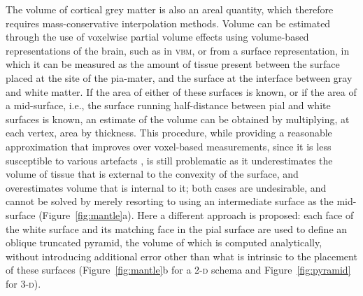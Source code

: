 The volume of cortical grey matter is also an areal quantity, which therefore requires mass-conservative interpolation methods. Volume can be estimated through the use of voxelwise partial volume effects using volume-based representations of the brain, such as in \textsc{vbm}, or from a surface representation, in which it can be measured as the amount of tissue present between the surface placed at the site of the pia-mater, and the surface at the interface between gray and white matter. If the area of either of these surfaces is known, or if the area of a mid-surface, i.e., the surface running half-distance between pial and white surfaces \citep{vanEssen2005} is known, an estimate of the volume can be obtained by multiplying, at each vertex, area by thickness. This procedure, while providing a reasonable approximation that improves over voxel-based measurements, since it is less susceptible to various artefacts \cite[for a discussion of artefacts in \textsc{vbm}, see][]{Ashburner2009}, is still problematic as it underestimates the volume of tissue that is external to the convexity of the surface, and overestimates volume that is internal to it; both cases are undesirable, and cannot be solved by merely resorting to using an intermediate surface as the mid-surface (Figure~\ref{fig:mantle}a). Here a different approach is proposed: each face of the white surface and its matching face in the pial surface are used to define an oblique truncated pyramid, the volume of which is computed analytically, without introducing additional error other than what is intrinsic to the placement of these surfaces (Figure~\ref{fig:mantle}b for a 2-\textsc{d} schema and Figure~\ref{fig:pyramid} for 3-\textsc{d}).

